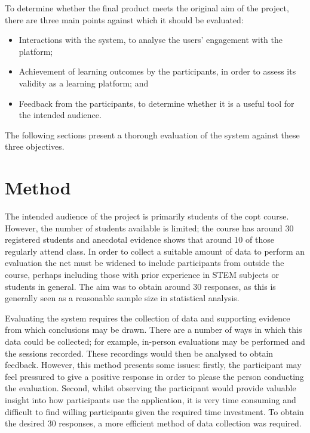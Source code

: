 \documentclass[bsc,twoside,singlespacing,parskip,logo,notimes,normalheadings]{infthesis}
\begin{document}
    To determine whether the final product meets the original aim of
    the project, there are three main points against which it should
    be evaluated:

    \begin{itemize}
    \item Interactions with the system, to analyse the users'
      engagement with the platform;
    \item Achievement of learning outcomes by the participants, in
      order to assess its validity as a learning platform; and
    \item Feedback from the participants, to determine whether it is a
      useful tool for the intended audience.
    \end{itemize}

    The following sections present a thorough evaluation of the
    system against these three objectives.

    \section{Method}

    The intended audience of the project is primarily students of the
    \gls{copt} course. However, the number of students available is
    limited; the course has around 30 registered students and
    anecdotal evidence shows that around 10 of those regularly attend
    class. In order to collect a suitable amount of data to perform an
    evaluation the net must be widened to include participants from
    outside the course, perhaps including those with prior experience
    in STEM subjects or students in general. The aim was to obtain
    around 30 responses, as this is generally seen as a reasonable
    sample size in statistical analysis.

    Evaluating the system requires the collection of data and
    supporting evidence from which conclusions may be drawn. There are
    a number of ways in which this data could be collected; for
    example, in-person evaluations may be performed and the sessions
    recorded. These recordings would then be analysed to obtain
    feedback. However, this method presents some issues: firstly, the
    participant may feel pressured to give a positive response in
    order to please the person conducting the evaluation. Second,
    whilst observing the participant would provide valuable insight
    into how participants use the application, it is very time
    consuming and difficult to find willing participants given the
    required time investment. To obtain the desired 30 responses, a
    more efficient method of data collection was required.
\end{document}
